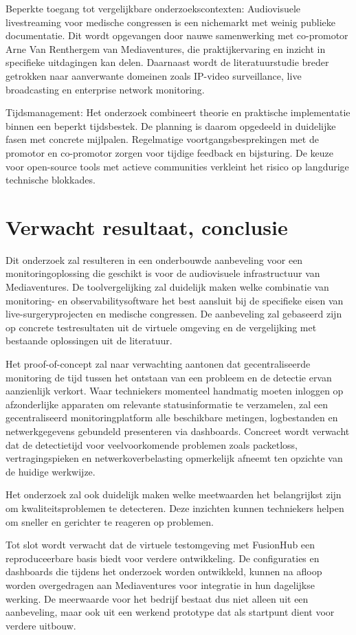 Beperkte toegang tot vergelijkbare onderzoekscontexten: Audiovisuele livestreaming voor medische congressen is een nichemarkt met weinig publieke documentatie. Dit wordt opgevangen door nauwe samenwerking met co-promotor Arne Van Renthergem van Mediaventures, die praktijkervaring en inzicht in specifieke uitdagingen kan delen. Daarnaast wordt de literatuurstudie breder getrokken naar aanverwante domeinen zoals IP-video surveillance, live broadcasting en enterprise network monitoring.

Tijdsmanagement: Het onderzoek combineert theorie en praktische implementatie binnen een beperkt tijdsbestek. De planning is daarom opgedeeld in duidelijke fasen met concrete mijlpalen. Regelmatige voortgangsbesprekingen met de promotor en co-promotor zorgen voor tijdige feedback en bijsturing. De keuze voor open-source tools met actieve communities verkleint het risico op langdurige technische blokkades.



\section{Verwacht resultaat, conclusie}
\label{sec:verwachte_resultaten}

Dit onderzoek zal resulteren in een onderbouwde aanbeveling voor een monitoringoplossing die geschikt is voor de audiovisuele infrastructuur van Mediaventures. De toolvergelijking zal duidelijk maken welke combinatie van monitoring- en observabilitysoftware het best aansluit bij de specifieke eisen van live-surgeryprojecten en medische congressen. De aanbeveling zal gebaseerd zijn op concrete testresultaten uit de virtuele omgeving en de vergelijking met bestaande oplossingen uit de literatuur.

Het proof-of-concept zal naar verwachting aantonen dat gecentraliseerde monitoring de tijd tussen het ontstaan van een probleem en de detectie ervan aanzienlijk verkort. Waar techniekers momenteel handmatig moeten inloggen op afzonderlijke apparaten om relevante statusinformatie te verzamelen, zal een gecentraliseerd monitoringplatform alle beschikbare metingen, logbestanden en netwerkgegevens gebundeld presenteren via dashboards. Concreet wordt verwacht dat de detectietijd voor veelvoorkomende problemen zoals packetloss, vertragingspieken en netwerkoverbelasting opmerkelijk afneemt ten opzichte van de huidige werkwijze.

Het onderzoek zal ook duidelijk maken welke meetwaarden het belangrijkst zijn om kwaliteitsproblemen te detecteren. Deze inzichten kunnen techniekers helpen om sneller en gerichter te reageren op problemen.

Tot slot wordt verwacht dat de virtuele testomgeving met FusionHub een reproduceerbare basis biedt voor verdere ontwikkeling. De configuraties en dashboards die tijdens het onderzoek worden ontwikkeld, kunnen na afloop worden overgedragen aan Mediaventures voor integratie in hun dagelijkse werking. De meerwaarde voor het bedrijf bestaat dus niet alleen uit een aanbeveling, maar ook uit een werkend prototype dat als startpunt dient voor verdere uitbouw.
